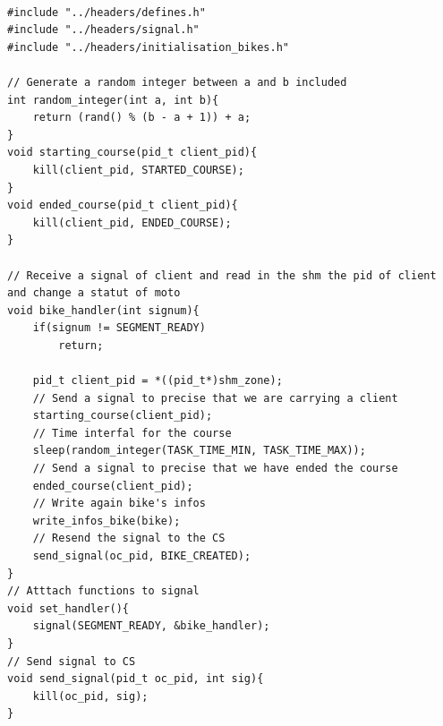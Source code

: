 \newpage
\begin{lstlisting}[style=customc, caption={ signals (transmission to scheduler , waiting , transmission to client)}]

#include "../headers/defines.h"
#include "../headers/signal.h"
#include "../headers/initialisation_bikes.h"

// Generate a random integer between a and b included
int random_integer(int a, int b){
	return (rand() % (b - a + 1)) + a;
}
void starting_course(pid_t client_pid){
	kill(client_pid, STARTED_COURSE);
}
void ended_course(pid_t client_pid){
	kill(client_pid, ENDED_COURSE);
}

// Receive a signal of client and read in the shm the pid of client and change a statut of moto
void bike_handler(int signum){
	if(signum != SEGMENT_READY)
		return;

	pid_t client_pid = *((pid_t*)shm_zone);
	// Send a signal to precise that we are carrying a client
	starting_course(client_pid);
	// Time interfal for the course
	sleep(random_integer(TASK_TIME_MIN, TASK_TIME_MAX)); 
	// Send a signal to precise that we have ended the course
	ended_course(client_pid);
	// Write again bike's infos
	write_infos_bike(bike);
	// Resend the signal to the CS
	send_signal(oc_pid, BIKE_CREATED);
}
// Atttach functions to signal
void set_handler(){
	signal(SEGMENT_READY, &bike_handler);
}
// Send signal to CS 
void send_signal(pid_t oc_pid, int sig){
	kill(oc_pid, sig);
}
\end{lstlisting}
\newpage

